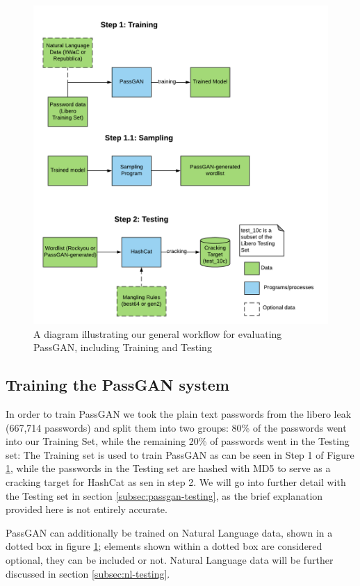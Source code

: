 \begin{figure}[H]
\centering
    \includegraphics[scale=0.8]{figures/testing_flowchart_fixed.png}
    \caption{A diagram illustrating our general workflow for evaluating PassGAN, including Training and Testing}
    \label{fig:testing_flowchart}
\end{figure}    

\subsection{Training the PassGAN system}\label{subsec:passgan-training}
In order to train PassGAN we took the plain text passwords from the libero leak (667,714 passwords) and split them into two groups: 80\% of the passwords went into our Training Set, while the remaining 20\% of passwords went in the Testing set: The Training set is used to train PassGAN as can be seen in Step 1 of Figure \ref{fig:testing_flowchart}, while the passwords in the Testing set are hashed with MD5 to serve as a cracking target for HashCat as sen in step 2. We will go into further detail with the Testing set in section \ref{subsec:passgan-testing}, as the brief explanation provided here is not entirely accurate.

PassGAN can additionally be trained on Natural Language data, shown in a dotted box in figure \ref{fig:testing_flowchart}; elements shown within a dotted box are considered optional, they can be included or not. Natural Language data will be further discussed in section \ref{subsec:nl-testing}.

